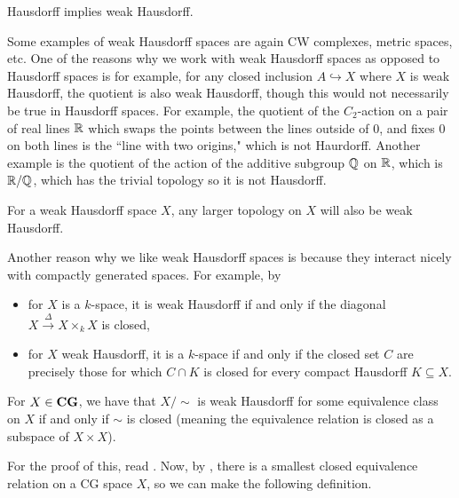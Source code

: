 \documentclass{article}[11pt]
\begin{document}
\begin{exercise} Hausdorff implies weak Hausdorff.
\end{exercise}

Some examples of weak Hausdorff spaces are again CW complexes, metric spaces, etc. One of the reasons why we work with weak Hausdorff spaces as opposed to Hausdorff spaces is for example, for any closed inclusion $A\hookrightarrow X$ where $X$ is weak Hausdorff, the quotient is also weak Hausdorff, though this would not necessarily be true in Hausdorff spaces.  For example, the quotient of the $C_2$-action on a pair of real lines $\mathbb{R}$ which swaps the points between the lines outside of 0, and fixes $0$ on both lines is the ``line with two origins," which is not Haurdorff. Another example is the quotient of the action of the additive subgroup $\mathbb{Q}$ on $\mathbb{R}$, which is $\mathbb{R}/\mathbb{Q}$, which has the trivial topology so it is not Hausdorff.

\begin{proposition} For a weak Hausdorff space $X$, any larger topology on $X$ will also be weak Hausdorff.
\end{proposition}

Another reason why we like weak Hausdorff spaces is because they interact nicely with compactly generated spaces. For example, by \cite[Lemma 1.4. and Proposition 2.14]{Strickland-cgwh}
\vspace{-1em}
\begin{itemize}\itemsep=0em
\item for $X$ is a $k$-space, it is weak Hausdorff if and only if the diagonal $X\xrightarrow{\Delta} X\times_k X$ is closed,
\item for $X$ weak Hausdorff, it is a $k$-space if and only if the closed set $C$ are precisely those for which $C\cap K$ is closed for every compact Hausdorff $K\subseteq X.$
\end{itemize}

\begin{proposition} For $X \in \textbf{CG}$, we have that $X\Big/\sim$ is weak Hausdorff for some equivalence class on $X$ if and only if $\sim$ is closed (meaning the equivalence relation is closed as a subspace of $X\times X$).
\end{proposition}

For the proof of this, read \cite[Corollary 2.21]{Strickland-cgwh}. Now, by \cite[Proposition 2.22]{Strickland-cgwh}, there is a smallest closed equivalence relation on a CG space $X$, so we can make the following definition.
\end{document}
